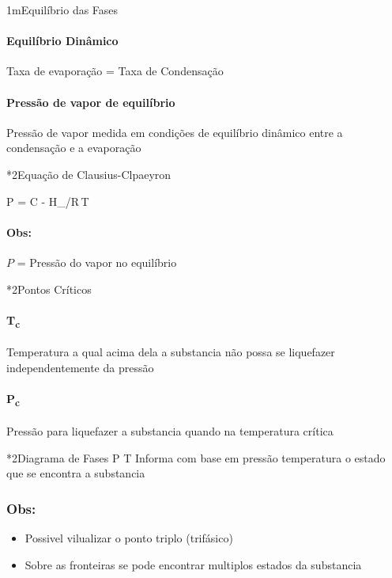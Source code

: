\begin{sectionBox}1m{Equilíbrio das Fases}

    \paragraph{Equilíbrio Dinâmico}%
        Taxa de evaporação = Taxa de Condensação

    \paragraph{Pressão de vapor de equilíbrio}%
        Pressão de vapor medida em condições de equilíbrio dinâmico entre a condensação e a evaporação


    \begin{sectionBox}*2{Equação de Clausius-Clpaeyron}

        \begin{BM}
            \ln P = C - \Delta H_{}/R\,T
        \end{BM}

        \paragraph{Obs:} $P$ = Pressão do vapor no equilíbrio

    \end{sectionBox}

    \begin{sectionBox}*2{Pontos Críticos}
        \paragraph{T\textsubscript{c}} Temperatura a qual acima dela a substancia não possa se liquefazer independentemente da pressão
        \paragraph{P\textsubscript{c}} Pressão para liquefazer a substancia quando na temperatura crítica
    \end{sectionBox}

    \begin{sectionBox}*2{Diagrama de Fases P\,\times\,T}
        Informa com base em pressão\,\times\,temperatura o estado que se encontra a substancia

        \subsubsection*{Obs:}
        \begin{itemize}
            \item Possivel vilualizar o ponto triplo (trifásico)
            \item Sobre as fronteiras se pode encontrar multiplos estados da substancia
        \end{itemize}


\end{sectionBox}
\end{sectionBox}
